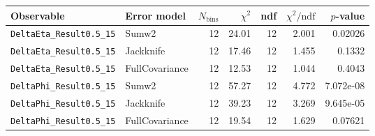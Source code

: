 \begin{tabular}{|l|l|r|r|r|r|r|}
\hline
Observable & Error model & $N_{\mathrm{bins}}$ & $\chi^2$ & ndf & $\chi^2/\mathrm{ndf}$ & $p$-value \\
\hline
\texttt{DeltaEta\_Result0.5\_15} & Sumw2 & 12 & 24.01 & 12 & 2.001 & 0.02026 \\
\texttt{DeltaEta\_Result0.5\_15} & Jackknife & 12 & 17.46 & 12 & 1.455 & 0.1332 \\
\texttt{DeltaEta\_Result0.5\_15} & FullCovariance & 12 & 12.53 & 12 & 1.044 & 0.4043 \\
\texttt{DeltaPhi\_Result0.5\_15} & Sumw2 & 12 & 57.27 & 12 & 4.772 & 7.072e-08 \\
\texttt{DeltaPhi\_Result0.5\_15} & Jackknife & 12 & 39.23 & 12 & 3.269 & 9.645e-05 \\
\texttt{DeltaPhi\_Result0.5\_15} & FullCovariance & 12 & 19.54 & 12 & 1.629 & 0.07621 \\
\hline
\end{tabular}
